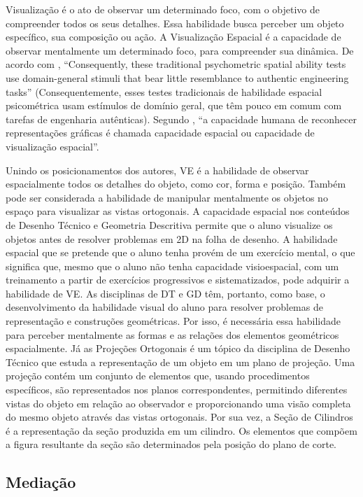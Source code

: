 Visualização é o ato de observar um determinado foco, com o objetivo de
compreender todos os seus detalhes. Essa habilidade busca perceber um
objeto específico, sua composição ou ação. A Visualização Espacial é a
capacidade de observar mentalmente um determinado foco, para compreender
sua dinâmica. De acordo com \textcite[p. 2]{cohen2018},
\enquote{Consequently, these traditional psychometric spatial ability tests use
domain-general stimuli that bear little resemblance to authentic
engineering tasks} (Consequentemente, esses testes tradicionais de
habilidade espacial psicométrica usam estímulos de domínio geral, que
têm pouco em comum com tarefas de engenharia autênticas). Segundo \textcite[p. 224]{suzuki2002}, \enquote{a capacidade humana de reconhecer representações gráficas é chamada capacidade espacial ou capacidade de visualização espacial}.

Unindo os posicionamentos dos autores, VE é a habilidade de observar
espacialmente todos os detalhes do objeto, como cor, forma e posição.
Também pode ser considerada a habilidade de manipular mentalmente os
objetos no espaço para visualizar as vistas ortogonais. A capacidade
espacial nos conteúdos de Desenho Técnico e Geometria Descritiva permite
que o aluno visualize os objetos antes de resolver problemas em 2D na
folha de desenho. A habilidade espacial que se pretende que o aluno
tenha provém de um exercício mental, o que significa que, mesmo que o
aluno não tenha capacidade visioespacial, com um treinamento a partir de
exercícios progressivos e sistematizados, pode adquirir a habilidade de
VE. As disciplinas de DT e GD têm, portanto, como base, o
desenvolvimento da habilidade visual do aluno para resolver problemas de
representação e construções geométricas. Por isso, é necessária essa
habilidade para perceber mentalmente as formas e as relações dos
elementos geométricos espacialmente. Já as Projeções Ortogonais é um
tópico da disciplina de Desenho Técnico que estuda a representação de um
objeto em um plano de projeção. Uma projeção contém um conjunto de
elementos que, usando procedimentos específicos, são representados nos
planos correspondentes, permitindo diferentes vistas do objeto em
relação ao observador e proporcionando uma visão completa do mesmo
objeto através das vistas ortogonais. Por sua vez, a Seção de Cilindros
é a representação da seção produzida em um cilindro. Os elementos que
compõem a figura resultante da seção são determinados pela posição do
plano de corte.

\subsection{Mediação}\label{sub-sec-mediação}

